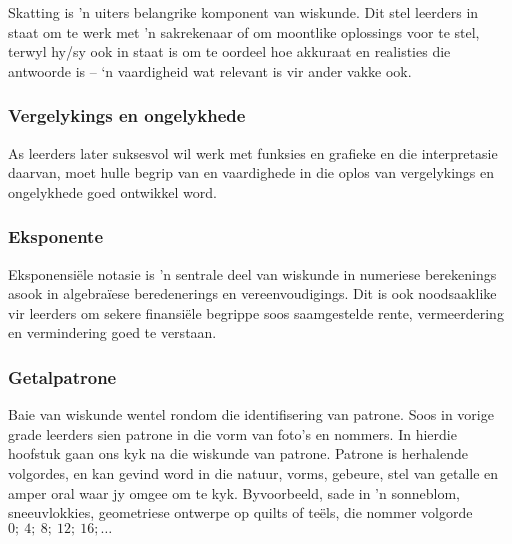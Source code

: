 Skatting is 'n uiters belangrike komponent van wiskunde. Dit stel leerders in staat om te werk met 'n sakrekenaar of om moontlike oplossings voor te stel, terwyl hy/sy ook in staat is om te oordeel hoe akkuraat en realisties die antwoorde is – ‘n vaardigheid wat relevant is vir ander vakke ook.

\subsubsection{Vergelykings en ongelykhede}
As leerders later suksesvol wil werk met funksies en grafieke en die interpretasie daarvan, moet hulle begrip van en vaardighede in die oplos van vergelykings en ongelykhede goed ontwikkel word.
\subsubsection{Eksponente}
Eksponensiële notasie is 'n sentrale deel van wiskunde in numeriese berekenings asook in algebraïese beredenerings en vereenvoudigings. Dit is ook noodsaaklike vir leerders om sekere finansiële begrippe soos saamgestelde rente, vermeerdering en vermindering goed te verstaan.

\subsubsection{Getalpatrone}
Baie van wiskunde wentel rondom die identifisering van patrone. Soos in vorige grade leerders sien patrone in die vorm van foto's en nommers. In hierdie hoofstuk gaan ons kyk na die wiskunde van patrone. Patrone is herhalende volgordes, en kan gevind word in die natuur, vorms, gebeure, stel van getalle en amper oral waar jy omgee om te kyk. Byvoorbeeld, sade in 'n sonneblom, sneeuvlokkies, geometriese ontwerpe op quilts of te\"{e}ls, die nommer volgorde $0; ~4;~ 8;~ 12; ~16; \ldots$

